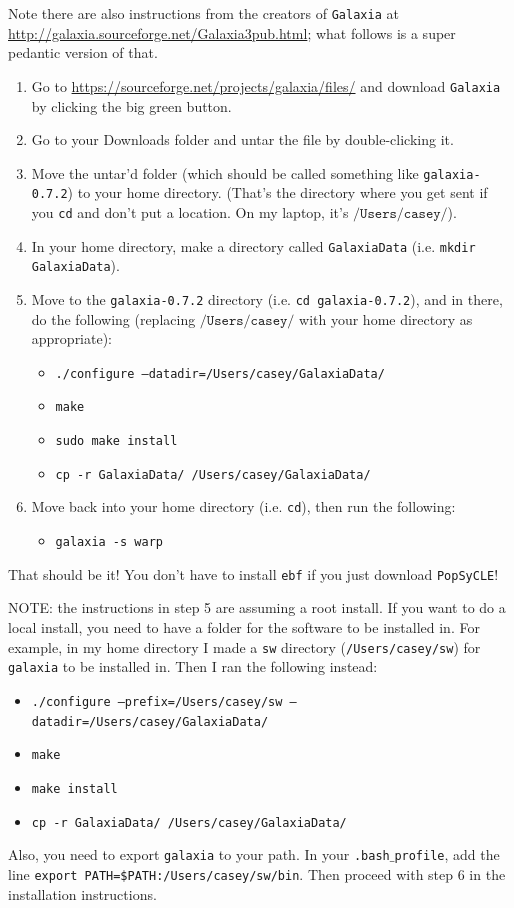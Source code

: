 \documentclass{scrartcl}
\begin{document}
Note there are also instructions from the creators of \texttt{Galaxia} at \url{http://galaxia.sourceforge.net/Galaxia3pub.html}; what follows is a super pedantic version of that.
\begin{enumerate}
    \item Go to \url{https://sourceforge.net/projects/galaxia/files/} and download \texttt{Galaxia} by clicking the big green button.
    \item Go to your Downloads folder and untar the file by double-clicking it.
    \item Move the untar'd folder (which should be called something like \texttt{galaxia-0.7.2}) to your home directory. 
    (That's the directory where you get sent if you \texttt{cd} and don't put a location. 
    On my laptop, it's $\texttt{/Users/casey/}$).
    \item In your home directory, make a directory called \texttt{GalaxiaData} (i.e. \texttt{mkdir GalaxiaData}).
    \item Move to the \texttt{galaxia-0.7.2} directory (i.e. \texttt{cd galaxia-0.7.2}), and in there, do the following (replacing $\texttt{/Users/casey/}$ with your home directory as appropriate):
    \begin{itemize}
        \item \texttt{./configure --datadir=/Users/casey/GalaxiaData/}
        \item \texttt{make}
        \item \texttt{sudo make install}
        \item \texttt{cp -r GalaxiaData/ /Users/casey/GalaxiaData/}
    \end{itemize}
    \item Move back into your home directory (i.e. \texttt{cd}), then run the following:
    \begin{itemize}
        \item \texttt{galaxia -s warp}
    \end{itemize}
\end{enumerate}
That should be it! 
You don't have to install \texttt{ebf} if you just download \texttt{PopSyCLE}!

NOTE: the instructions in step 5 are assuming a root install. 
If you want to do a local install, you need to have a folder for the software to be installed in.
For example, in my home directory I made a \texttt{sw} directory (\texttt{/Users/casey/sw}) for \texttt{galaxia} to be installed in.
Then I ran the following instead:
    \begin{itemize}
        \item \texttt{./configure --prefix=/Users/casey/sw --datadir=/Users/casey/GalaxiaData/}
        \item \texttt{make}
        \item \texttt{make install}
        \item \texttt{cp -r GalaxiaData/ /Users/casey/GalaxiaData/}
    \end{itemize}
Also, you need to export \texttt{galaxia} to your path. 
In your \texttt{.bash$\_$profile}, add the line \texttt{export PATH=\$PATH:/Users/casey/sw/bin}.
Then proceed with step 6 in the installation instructions.
\end{document}
